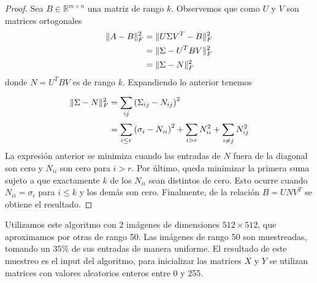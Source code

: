 \begin{proof}
    Sea $B \in \mathbb{R}^{m \times n}$ una matriz de rango $k$. Observemos que como $U$ y $V$ son matrices ortogonales
    \begin{align*}
        \lVert A - B\rVert_F^2 &= \lVert U \Sigma V^T - B\rVert_F^2 \\
                         &=\lVert\Sigma - U^T B V\rVert_F^2 \\
                         &=\lVert\Sigma - N\rVert_F^2
    \end{align*}
    donde $N = U^T B V$ es de rango $k$. Expandiendo lo anterior tenemos
    \begin{align*}
        \lVert\Sigma - N\rVert_F^2 &= \sum_{ij}^{} \left( \Sigma_{ij} - N_{ij} \right)^2 \\
                              &= \sum_{i \leq r}^{} \left( \sigma_i - N_{ii} \right)^2 + \sum_{i > r}^{} N_{ii}^2 + \sum_{i \neq j}^{} N_{ij}^2
    \end{align*}
    La expresión anterior se minimiza cuando las entradas de $N$ fuera de la diagonal son cero y $N_{ii}$ son cero para $i > r$. Por último, queda minimizar la primera suma sujeto a que exactamente $k$ de los $N_{ii}$ sean distintos de cero. Esto ocurre cuando $N_{ii} = \sigma_i$ para $i \leq k$ y los demás son cero. Finalmente, de la relación $B = UNV^T$ se obtiene el resultado.
\end{proof}

Utilizamos este algoritmo con 2 imágenes de dimensiones $512 \times 512$, que aproximamos por otras de rango 50. Las imágenes de rango 50 son muestreadas, tomando un $35\%$ de sus entradas de manera uniforme. El resultado de este muestreo es el input del algoritmo, para inicializar las matrices $X$ y $Y$ se utilizan matrices con valores aleatorios enteros entre 0 y 255.

